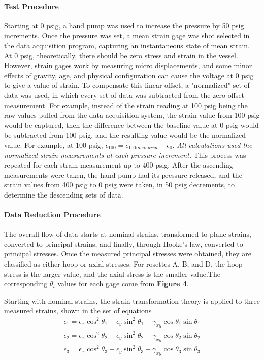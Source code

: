 \documentclass[12pt]{article}
\begin{document}
\paragraph{Test Procedure}
Starting at 0 psig, a hand pump was used to increase the pressure by 50 psig increments. Once the pressure was set, a mean strain gage was shot selected in the data acquisition program, capturing an instantaneous 
state of mean strain. At 0 psig, theoretically, there should
be zero stress and strain in the vessel. However, strain gages work by measuring micro displacements, and some
minor effects of gravity, age, and physical configuration can cause the voltage at 0 psig to give a value of strain. To
compensate this linear offset, a "normalized" set of data was used, in which every set of data was subtracted from the
zero offset measurement. For example, instead of the strain reading at 100 psig being the raw values pulled from
the data acquisition system, the strain value from 100 psig would be captured, then the difference between the 
baseline value at 0 psig would be subtracted from 100 psig, and the resulting value would be the normalized value. For example, at 100 psig, $ \epsilon_{100} = \epsilon_{100 measured} - \epsilon_0 $. \textit{All calculations used the normalized strain measurements at each pressure increment.} This process
was repeated for each strain measurement up to 400 psig. After the ascending measurements were taken, the 
hand pump had its pressure released, and the strain values from 400 psig to 0 psig were taken, in 50 psig decrements, to determine the descending sets of data. 


\paragraph {Data Reduction Procedure }
The overall flow of data starts at nominal strains, transformed to plane strains, converted  to
principal strains, and finally, through Hooke's law, converted to principal stresses. Once the measured 
principal stresses were obtained, they are  classified as either hoop or axial stresses. For rosettes A, B, and D,
the hoop stress is the larger value, and the axial stress is the smaller value.The corresponding $\theta_i$ values for each gage come from \textbf{Figure 4}. 

Starting with nominal strains, the strain transformation theory is applied to three measured strains, shown in the set of equations 
\begin{align}
\epsilon_1 = \epsilon_x\cos^{2}\theta_1 + \epsilon_y\sin^{2}\theta_1 + \gamma_{xy}\cos{\theta_1}\sin{\theta_1} \\
\epsilon_2 = \epsilon_x\cos^{2}\theta_2 + \epsilon_y\sin^{2}\theta_2 + \gamma_{xy}\cos{\theta_2}\sin{\theta_2} \\
\epsilon_3 = \epsilon_x\cos^{2}\theta_3 + \epsilon_y\sin^{2}\theta_3 + \gamma_{xy}\cos{\theta_3}\sin{\theta_3} 
\end{align}
\end{document}
